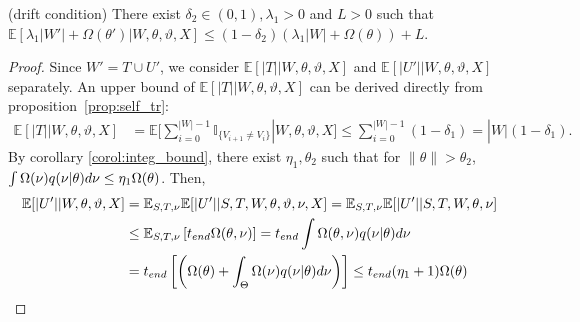 \begin{lemma}(drift condition) There exist $\delta_2 \in (0, 1), \lambda_1 > 0$ and $L > 0$
  such that
  $\mathbb{E}\left[\lambda_1|W'| + \Omega(\theta')  | W, \theta, \vartheta, X\right]
  \leq (1 - \delta_2)\left(\lambda_1|W| + \Omega(\theta)   \right) + L$.
\label{lem:drift}
\end{lemma}
\begin{proof}
Since $W'=T\cup U'$, we consider $\mathbb{E}[|T| |W,\theta,\vartheta,X]$
and $\mathbb{E}[|U'| | W, \theta, \vartheta, X]$ separately.
An upper bound of $\mathbb{E}[|T| | W,\theta,\vartheta, X]$ can be derived
directly from proposition~\ref{prop:self_tr}:
\begin{align*}
\mathbb{E}[|T| |W,\theta,\vartheta,X] &= \mathbb{E}[\sum_{i = 0}^{|W|-1}
  \mathbb{I}_{\{ V_{i + 1} \neq V_i \}}| W, \theta, \vartheta, X]
\leq \sum_{i = 0}^{|W| - 1} (1 - \delta_1) = |W|(1 - \delta_1).
\end{align*}
By corollary \ref{corol:integ_bound}, there exist $\eta_1 , \theta_2$ 
such that for 
$ \| \theta \| > \theta_2$, 
 $ \int \Omega(\nu) q(\nu | \theta)d\nu \leq \eta_1 \Omega(\theta) 
 $. Then,
\begin{align*}
\mathbb{E}[|U'| |W, \theta, \vartheta, X] &= 
\mathbb{E}_{S,T, \ptheta}\mathbb{E}[|U'| | S, T, W, \theta, \vartheta, \ptheta, X] = \mathbb{E}_{S,T, \ptheta}\mathbb{E}[|U'| | S, T, W, \theta, \ptheta] \\
& \leq \mathbb{E}_{S,T, \ptheta} \left[t_{end}\Omega(\theta, \ptheta)\right] = t_{end}\int \Omega(\theta, \ptheta) q(\ptheta | \theta) d\ptheta\\
& = t_{end} \left[ \left(  \Omega(\theta) +
\int_\Theta \Omega(\ptheta) q(\ptheta | \theta)d\ptheta \right) \right] 
 \leq t_{end} (\eta_1 + 1) \Omega(\theta) %
\end{align*}

\end{proof}
